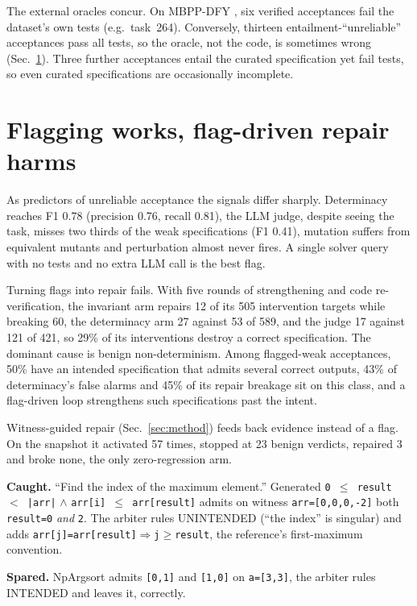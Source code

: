 \documentclass{esannV2}
\begin{document}
The external oracles concur. On MBPP-DFY \cite{aiassist}, six verified acceptances
fail the dataset's own tests (e.g.\ task~264). Conversely,
thirteen entailment-``unreliable'' acceptances pass all tests, so the oracle,
not the code, is sometimes wrong
(Sec.~\ref{sec:repair}). Three further acceptances entail the curated specification
yet fail tests, so even curated specifications are occasionally incomplete.

\section{Flagging works, flag-driven repair harms}
\label{sec:repair}

As predictors of unreliable acceptance the signals differ sharply.
Determinacy reaches F1 0.78 (precision 0.76, recall 0.81),
the LLM judge, despite seeing the task, misses two thirds of the weak
specifications (F1 0.41), mutation suffers from equivalent mutants and
perturbation almost never fires. A single solver query with no tests and no extra
LLM call is the best flag.

Turning flags into repair fails. With five rounds of
strengthening and code re-verification, the invariant arm repairs 12 of its 505
intervention targets while breaking 60, the determinacy arm 27 against 53 of 589,
and the judge 17 against 121 of 421, so 29\% of its interventions destroy a
correct specification. The dominant cause is benign non-determinism. Among
flagged-weak acceptances, 50\% have an intended specification that admits several
correct outputs, 43\% of determinacy's false alarms and 45\% of its repair
breakage sit on this class, and a flag-driven loop strengthens such
specifications past the intent.

Witness-guided repair (Sec.~\ref{sec:method}) feeds back evidence instead of a
flag. On the snapshot it activated 57 times, stopped at 23 benign verdicts,
repaired 3 and broke none, the only zero-regression arm.

{\footnotesize\textbf{Caught.} ``Find the index of the maximum element.''
Generated \texttt{0\,$\le$\,result\,$<$\,|arr|} $\wedge$ \texttt{arr[i]\,$\le$\,arr[result]}
admits on witness \texttt{arr=[0,0,0,-2]} both \texttt{result=0} \emph{and}
\texttt{2}. The arbiter rules UNINTENDED (``the index'' is singular) and adds
\texttt{arr[j]=arr[result]${\Rightarrow}$j$\ge$result}, the reference's
first-maximum convention.\par
\textbf{Spared.} NpArgsort admits \texttt{[0,1]} and \texttt{[1,0]} on
\texttt{a=[3,3]}, the arbiter rules INTENDED and leaves it, correctly.\par}
\end{document}

